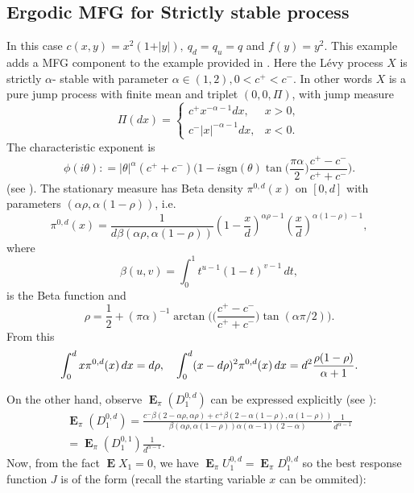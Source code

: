 \documentclass{article}
\newcommand\E{\operatorname{\mathbf{E}}}
\begin{document}
\subsection{Ergodic MFG for Strictly stable process}
In this case $c(x,y)=x^2 (1+\vert y \vert ), \ q_d=q_u=q$ and $f(y)=y^2$.
This example adds a MFG component to the example provided in \cite[5.4]{MO}.
Here the L\'evy process $X$ is strictly $\alpha$- stable  with parameter $\alpha \in (1,2), 0<c^+<c^-$.
In other words $X$ is a pure jump process with finite mean and triplet $(0,0,\Pi)$, with jump measure
\[ 
\Pi(dx)= 
\begin{cases}
c^{+} x^{-\alpha -1}dx, & x>0, \\
c^{-} \vert x \vert^{-\alpha -1} dx ,& x<0.
\end{cases}
\]
The characteristic exponent is
\[
\phi(i \theta) \colon =\vert \theta \vert^{\alpha}(c^+ + c^-) \Big(1- i \text{sgn}(\theta)\tan \big(\frac{\pi \alpha}{2} \big) \frac{c^+ -c^-}{c^+ + c^-} \Big) .
\]
(see \cite[page 10]{KRI}). 
The stationary measure has Beta density $\pi^{0,d}(x)$ on $[0,d]$ with parameters
$(\alpha \rho, \alpha (1-\rho))$, i.e.
\begin{equation*}
\pi^{0,d}(x)=\frac1{d \beta(\alpha \rho, \alpha (1-\rho))} \left(1-\frac{x}{d} \right)^{\alpha \rho -1} 
\left(\frac{x}{d} \right)^{\alpha (1-\rho)-1}, 
\end{equation*}
where 
$$
\beta(u,v)=\int_0^1t^{u-1}(1-t)^{v-1}\,dt,
$$ 
is the Beta function and 
\[
\rho= \frac{1}{2}+ (\pi \alpha)^{-1} \arctan \bigg( \Big(\frac{c^+ - c^-}{c^+ + c^-} \Big)  \tan(\alpha \pi/2) \bigg). 
\]
From this
\begin{equation}\label{Ch3:Stablemoments}
    \int_0^dx\pi^{0,d}(x)\,dx=d\rho,\quad
\int_0^d(x-d\rho)^2\pi^{0,d}(x)\,dx=d^2{\rho(1-\rho)\over\alpha+1}.
\end{equation}

%
On the other hand, observe $\E_{\pi}(D^{0,d}_1)$  can be expressed explicitly
(see \cite[page 114]{AAGP}): 
%
\begin{multline}\label{E:stableProcesslossrate}
\E_{\pi}(D_1^{0,d})   = \frac{c^- \beta(2-\alpha \rho, \alpha \rho)+c^+ \beta(2-\alpha(1- \rho),\alpha (1-\rho))}{\beta(\alpha \rho, \alpha (1-\rho))\alpha (\alpha -1)(2-\alpha)}\frac{1}{d^{\alpha-1}}
    \\=\E_{\pi}(D_1^{0,1})\frac{1}{d^{\alpha-1}}.
\end{multline}
  Now, from the fact $\E X_1=0$, we have $\E_{\pi }U_1^{0,d}=\E_{\pi} D^{0,d}_1$ so the best response function $J$ is of the form (recall the starting variable $x$ can be ommited):
\end{document}
